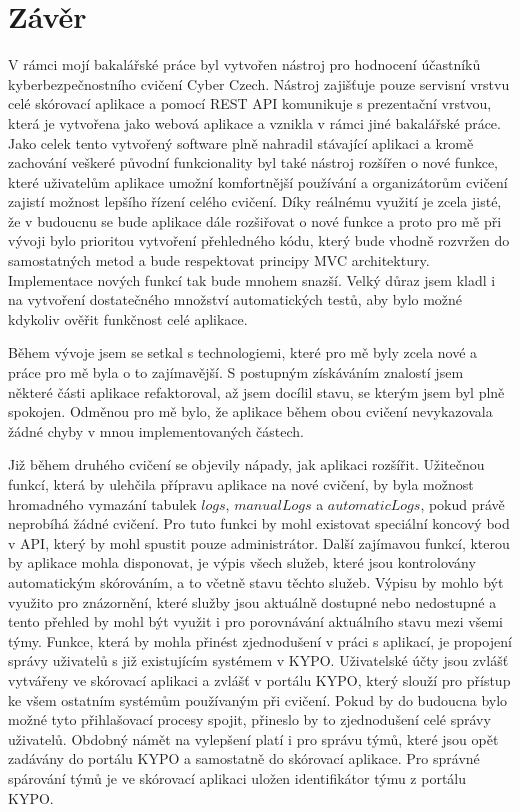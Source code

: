 \documentclass[
  digital,
  twoside,
  table, 
  nolof, 
  nolot
]{fithesis3}
\begin{document}
\chapter{Závěr}
\label{end}

V rámci mojí bakalářské práce byl vytvořen nástroj pro hodnocení účastníků kyberbezpečnostního cvičení Cyber Czech. Nástroj zajišťuje pouze servisní vrstvu celé skórovací aplikace a pomocí REST API komunikuje s prezentační vrstvou, která je vytvořena jako webová aplikace a vznikla v rámci jiné bakalářské práce. Jako celek tento vytvořený software plně nahradil stávající aplikaci a kromě zachování veškeré původní funkcionality byl také nástroj rozšířen o nové funkce, které uživatelům aplikace umožní komfortnější používání a organizátorům cvičení zajistí možnost lepšího řízení celého cvičení. Díky reálnému využití je zcela jisté, že v budoucnu se bude aplikace dále rozšiřovat o nové funkce a proto pro mě při vývoji bylo prioritou vytvoření přehledného kódu, který bude vhodně rozvržen do samostatných metod a bude respektovat principy MVC architektury. Implementace nových funkcí tak bude mnohem snazší. Velký důraz jsem kladl i na vytvoření dostatečného množství automatických testů, aby bylo možné kdykoliv ověřit funkčnost celé aplikace.

Během vývoje jsem se setkal s technologiemi, které pro mě byly zcela nové a práce pro mě byla o to zajímavější. S postupným získáváním znalostí jsem některé části aplikace refaktoroval, až jsem docílil stavu, se kterým jsem byl plně spokojen. Odměnou pro mě bylo, že aplikace během obou cvičení nevykazovala žádné chyby v mnou implementovaných částech.

Již během druhého cvičení se objevily nápady, jak aplikaci rozšířit. Užitečnou funkcí, která by ulehčila přípravu aplikace na nové cvičení, by byla možnost hromadného vymazání tabulek $logs$, $manualLogs$ a $automaticLogs$, pokud právě neprobíhá žádné cvičení. Pro tuto funkci by mohl existovat speciální koncový bod v API, který by mohl spustit pouze administrátor. Další zajímavou funkcí, kterou by aplikace mohla disponovat, je výpis všech služeb, které jsou kontrolovány automatickým skórováním, a to včetně stavu těchto služeb. Výpisu by mohlo být využito pro znázornění, které služby jsou aktuálně dostupné nebo nedostupné a tento přehled by mohl být využit i pro porovnávání aktuálního stavu mezi všemi týmy. Funkce, která by mohla přinést zjednodušení v práci s aplikací, je propojení správy uživatelů s již existujícím systémem v KYPO. Uživatelské účty jsou zvlášť vytvářeny ve skórovací aplikaci a zvlášť v portálu KYPO, který slouží pro přístup ke všem ostatním systémům používaným při cvičení. Pokud by do budoucna bylo možné tyto přihlašovací procesy spojit, přineslo by to zjednodušení celé správy uživatelů. Obdobný námět na vylepšení platí i pro správu týmů, které jsou opět zadávány do portálu KYPO a samostatně do skórovací aplikace. Pro správné spárování týmů je ve skórovací aplikaci uložen identifikátor týmu z portálu KYPO.
\end{document}
